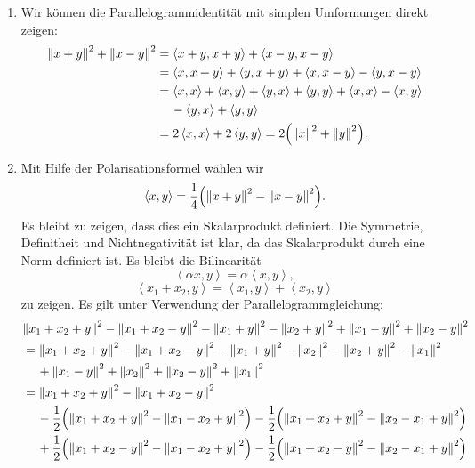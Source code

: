 \documentclass[german,12pt]{homework}
\newcommand{\dotproduct}[2]{\left\langle#1, #2\right\rangle}
\DeclarePairedDelimiter{\norm}{\lVert}{\rVert}
\DeclarePairedDelimiter{\enbrace}{(}{)}
\begin{document}
    \begin{enumerate}
        \item Wir können die Parallelogrammidentität mit simplen Umformungen direkt zeigen:
        \begin{align*}
            \norm*{x + y}^2 + \norm*{x - y}^2 &= \dotproduct{x + y}{x + y} + \dotproduct{x - y}{x - y}\\
            &= \dotproduct{x}{x + y} + \dotproduct{y}{x + y} + \dotproduct{x}{x - y} - \dotproduct{y}{x - y}\\
            &= \dotproduct{x}{x} + \dotproduct{x}{y} + \dotproduct{y}{x} + \dotproduct{y}{y} + \dotproduct{x}{x} - \dotproduct{x}{y}\\
            &\quad\, - \dotproduct{y}{x} + \dotproduct{y}{y}\\
            &= 2\dotproduct{x}{x} + 2\dotproduct{y}{y} = 2\enbrace*{\norm*{x}^2 + \norm*{y}^2}.
        \end{align*}
        \item Mit Hilfe der Polarisationsformel wählen wir
        \[\dotproduct{x}{y} = \frac{1}{4}\enbrace*{\norm*{x + y}^2 - \norm*{x - y}^2}.\]
        Es bleibt zu zeigen, dass dies ein Skalarprodukt definiert. Die Symmetrie, Definitheit und Nichtnegativität ist klar, da das Skalarprodukt durch eine Norm definiert ist. Es bleibt die Bilinearität
        \[\dotproduct{\alpha{x}}{y} = \alpha\dotproduct{x}{y},\]
        \[\dotproduct{x_1 + x_2}{y} = \dotproduct{x_1}{y} + \dotproduct{x_2}{y}\]
        zu zeigen. Es gilt unter Verwendung der Parallelogrammgleichung:
        \begin{align*}
            &\norm*{x_1 + x_2 + y}^2 - \norm*{x_1 + x_2 - y}^2 - \norm*{x_1 + y}^2 - \norm*{x_2 + y}^2 + \norm*{x_1 - y}^2 + \norm*{x_2 - y}^2\\
            &= \norm*{x_1 + x_2 + y}^2 - \norm*{x_1 + x_2 - y}^2 - \norm*{x_1 + y}^2 - \norm*{x_2}^2 - \norm*{x_2 + y}^2 - \norm*{x_1}^2\\
            &\quad\, + \norm*{x_1 - y}^2 + \norm*{x_2}^2 + \norm*{x_2 - y}^2 + \norm*{x_1}^2\\
            &= \norm*{x_1 + x_2 + y}^2 - \norm*{x_1 + x_2 - y}^2\\
            &\quad\, - \frac{1}{2}\enbrace*{\norm*{x_1 + x_2 + y}^2 - \norm*{x_1 - x_2 + y}^2} - \frac{1}{2}\enbrace*{\norm*{x_1 + x_2 + y}^2 - \norm*{x_2 - x_1 + y}^2}\\
            &\quad\, + \frac{1}{2}\enbrace*{\norm*{x_1 + x_2 - y}^2 - \norm*{x_1 - x_2 + y}^2} - \frac{1}{2}\enbrace*{\norm*{x_1 + x_2 - y}^2 - \norm*{x_2 - x_1 + y}^2}\\

\end{align*}
\end{enumerate}
\end{document}
